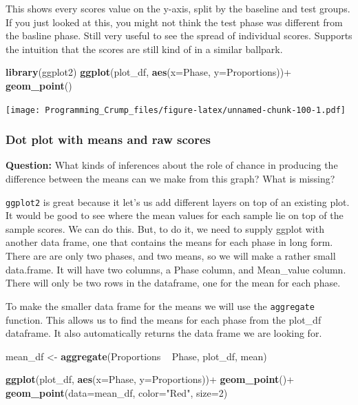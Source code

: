 \documentclass[]{book}
\newenvironment{Shaded}{\begin{snugshade}}{\end{snugshade}}
\newcommand{\KeywordTok}[1]{\textcolor[rgb]{0.13,0.29,0.53}{\textbf{{#1}}}}
\newcommand{\DataTypeTok}[1]{\textcolor[rgb]{0.13,0.29,0.53}{{#1}}}
\newcommand{\DecValTok}[1]{\textcolor[rgb]{0.00,0.00,0.81}{{#1}}}
\newcommand{\StringTok}[1]{\textcolor[rgb]{0.31,0.60,0.02}{{#1}}}
\newcommand{\NormalTok}[1]{{#1}}
\theoremstyle{definition}
\theoremstyle{definition}
\theoremstyle{definition}
\theoremstyle{remark}
\begin{document}
This shows every scores value on the y-axis, split by the baseline and
test groups. If you just looked at this, you might not think the test
phase was different from the basline phase. Still very useful to see the
spread of individual scores. Supports the intuition that the scores are
still kind of in a similar ballpark.

\begin{Shaded}
\begin{Highlighting}[]
\KeywordTok{library}\NormalTok{(ggplot2)}
\KeywordTok{ggplot}\NormalTok{(plot_df, }\KeywordTok{aes}\NormalTok{(}\DataTypeTok{x=}\NormalTok{Phase, }\DataTypeTok{y=}\NormalTok{Proportions))+}
\StringTok{  }\KeywordTok{geom_point}\NormalTok{()}
\end{Highlighting}
\end{Shaded}

\texttt{[image: Programming\_Crump\_files/figure-latex/unnamed-chunk-100-1.pdf]}

\subsubsection{Dot plot with means and raw
scores}\label{dot-plot-with-means-and-raw-scores}

\textbf{Question:} What kinds of inferences about the role of chance in
producing the difference between the means can we make from this graph?
What is missing?

\texttt{ggplot2} is great because it let's us add different layers on
top of an existing plot. It would be good to see where the mean values
for each sample lie on top of the sample scores. We can do this. But, to
do it, we need to supply ggplot with another data frame, one that
contains the means for each phase in long form. There are are only two
phases, and two means, so we will make a rather small data.frame. It
will have two columns, a Phase column, and Mean\_value column. There
will only be two rows in the dataframe, one for the mean for each phase.

To make the smaller data frame for the means we will use the
\texttt{aggregate} function. This allows us to find the means for each
phase from the plot\_df dataframe. It also automatically returns the
data frame we are looking for.

\begin{Shaded}
\begin{Highlighting}[]
\NormalTok{mean_df <-}\StringTok{ }\KeywordTok{aggregate}\NormalTok{(Proportions ~}\StringTok{ }\NormalTok{Phase, plot_df, mean)}

\KeywordTok{ggplot}\NormalTok{(plot_df, }\KeywordTok{aes}\NormalTok{(}\DataTypeTok{x=}\NormalTok{Phase, }\DataTypeTok{y=}\NormalTok{Proportions))+}\StringTok{ }
\StringTok{  }\KeywordTok{geom_point}\NormalTok{()+}
\StringTok{  }\KeywordTok{geom_point}\NormalTok{(}\DataTypeTok{data=}\NormalTok{mean_df, }\DataTypeTok{color=}\StringTok{"Red"}\NormalTok{, }\DataTypeTok{size=}\DecValTok{2}\NormalTok{)}
\end{Highlighting}
\end{Shaded}
\end{document}
